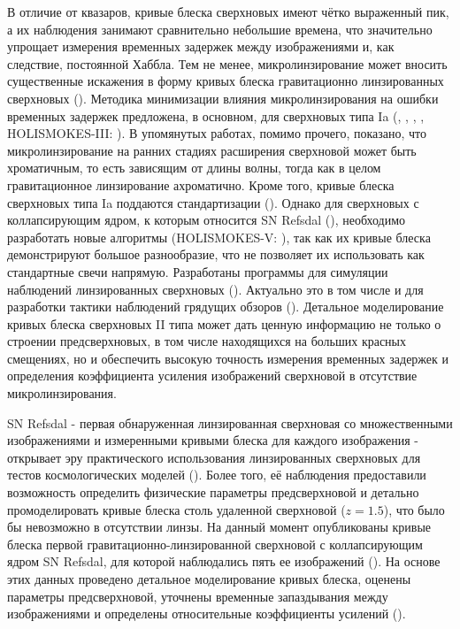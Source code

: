 В отличие от квазаров, кривые блеска сверхновых имеют чётко выраженный пик, а их наблюдения занимают сравнительно небольшие времена, что значительно упрощает измерения временных задержек между изображениями и, как следствие, постоянной Хаббла. Тем не менее, микролинзирование может вносить существенные искажения в форму кривых блеска гравитационно линзированных сверхновых (\cite{doblerkeeton2006}). Методика минимизации влияния микролинзирования на ошибки временных задержек предложена, в основном, для сверхновых типа Ia (\cite{moresuyu2017}, \cite{goldstein2018}, \cite{foxleymarrable2018}, \cite{bonvin2019}, HOLISMOKES-III: \cite{holismokesIII}). В упомянутых работах, помимо прочего, показано, что микролинзирование на ранних стадиях расширения сверхновой может быть хроматичным, то есть зависящим от длины волны, тогда как в целом гравитационное линзирование ахроматично. Кроме того, кривые блеска сверхновых типа Ia поддаются стандартизации (\cite{1a_standart}). Однако для сверхновых с коллапсирующим ядром, к которым относится SN Refsdal (\cite{kelly2016}), необходимо разработать новые алгоритмы (HOLISMOKES-V: \cite{holismokesV}), так как их кривые блеска демонстрируют большое разнообразие, что не позволяет их использовать как стандартные свечи напрямую. Разработаны программы для симуляции наблюдений линзированных сверхновых (\cite{pierelrodney2019}). Актуально это в том числе и для разработки тактики наблюдений грядущих обзоров (\cite{hubersuyu2019}). Детальное моделирование кривых блеска сверхновых II типа может дать ценную информацию не только о строении предсверхновых, в том числе находящихся на больших красных смещениях, но и обеспечить высокую точность измерения временных задержек и определения коэффициента усиления изображений сверхновой в отсутствие микролинзирования.


SN Refsdal - первая обнаруженная линзированная сверхновая со множественными изображениями и измеренными кривыми блеска для каждого изображения - открывает эру практического использования линзированных сверхновых для тестов космологических моделей (\cite{grillo2018}). Более того, её наблюдения предоставили возможность определить физические параметры предсверхновой и детально промоделировать кривые блеска столь удаленной сверхновой ($z = 1.5$), что было бы невозможно в отсутствии линзы. На данный момент опубликованы кривые блеска первой гравитационно-линзированной сверхновой с коллапсирующим ядром SN Refsdal, для которой наблюдались пять ее изображений (\cite{rodney2016}). На основе этих данных проведено детальное моделирование кривых блеска, оценены параметры предсверхновой, уточнены временные запаздывания между изображениями и определены относительные коэффициенты усилений (\cite{petrnat2020}). 

